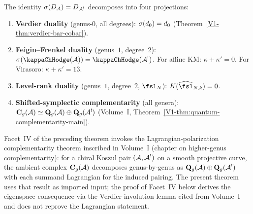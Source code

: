 \begin{theorem}
\label{thm:thqg-IV-four-facets}
The identity $\sigma(D_{\mathcal{A}}) = D_{\mathcal{A}^!}$ decomposes into four
projections:
\begin{enumerate}[label=\textup{(\Roman*)}]
\item \textbf{Verdier duality} (genus-$0$, all degrees):
 $\sigma(d_0) = d_0$
 (Theorem~\ref*{V1-thm:verdier-bar-cobar}).

\item \textbf{Feigin--Frenkel duality} (genus~$1$, degree~$2$):
 $\sigma(\kappaChHodge(\cA)) = \kappaChHodge(\cA^!)$.
 For affine KM: $\kappa + \kappa' = 0$.
 For Virasoro: $\kappa + \kappa' = 13$.

\item \textbf{Level-rank duality} (genus~$1$, degree~$2$, $\fsl_N$):
 $K(\widehat{\fsl}_{N,k}) = 0$.

\item \textbf{Shifted-symplectic complementarity} (all genera):
 $\mathbf{C}_g(\mathcal{A}) \simeq \mathbf{Q}_g(\mathcal{A}) \oplus
 \mathbf{Q}_g(\mathcal{A}^!)$
 (Volume~I, Theorem~\ref{V1-thm:quantum-complementarity-main}).
\end{enumerate}
\end{theorem}

\begin{remark}
\label{rem:thqg-IV-four-facets-attribution}
Facet~IV of the preceding theorem invokes the Lagrangian-polarization
complementarity theorem inscribed in Volume~I (chapter on higher-genus
complementarity): for a chiral Koszul pair $(\mathcal{A},\mathcal{A}^!)$ on a smooth
projective curve, the ambient complex $\mathbf{C}_g(\mathcal{A})$ decomposes
genus-by-genus as $\mathbf{Q}_g(\mathcal{A}) \oplus \mathbf{Q}_g(\mathcal{A}^!)$ with
each summand Lagrangian for the induced pairing. The present theorem
uses that result as imported input; the proof of Facet~IV below derives
the eigenspace consequence via the Verdier-involution lemma cited from
Volume~I and does not reprove the Lagrangian statement.
\end{remark}

